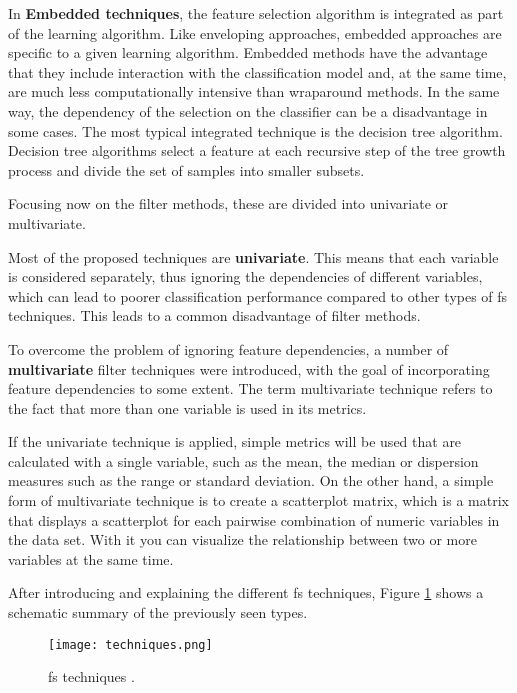In \textbf{Embedded techniques}, the feature selection algorithm is integrated as part of the learning algorithm. Like enveloping approaches, embedded approaches are specific to a given learning algorithm. Embedded methods have the advantage that they include interaction with the classification model and, at the same time, are much less computationally intensive than wraparound methods. In the same way, the dependency of the selection on the classifier can be a disadvantage in some cases. The most typical integrated technique is the decision tree algorithm. Decision tree algorithms select a feature at each recursive step of the tree growth process and divide the set of samples into smaller subsets.

Focusing now on the filter methods, these are divided into univariate or multivariate.

Most of the proposed techniques are \textbf{univariate}. This means that each variable is considered separately, thus ignoring the dependencies of different variables, which can lead to poorer classification performance compared to other types of \acrshort{fs} techniques. This leads to a common disadvantage of filter methods.

To overcome the problem of ignoring feature dependencies, a number of \textbf{multivariate} filter techniques were introduced, with the goal of incorporating feature dependencies to some extent. The term multivariate technique refers to the fact that more than one variable is used in its metrics.

If the univariate technique is applied, simple metrics will be used that are calculated with a single variable, such as the mean, the median or dispersion measures such as the range or standard deviation. On the other hand, a simple form of multivariate technique is to create a scatterplot matrix, which is a matrix that displays a scatterplot for each pairwise combination of numeric variables in the data set. With it you can visualize the relationship between two or more variables at the same time.

After introducing and explaining the different \acrshort{fs} techniques, Figure \ref{fig:techniques} shows a schematic summary of the previously seen types.

\begin{figure}[H]
    \centering
    \texttt{[image: techniques.png]}
    \caption{\acrlong{fs} techniques \cite{fs-method-ml}.}
    \label{fig:techniques}
\end{figure}

